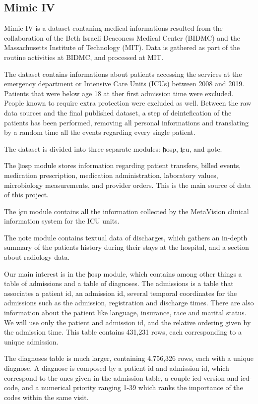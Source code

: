 \documentclass[]{marticle}
\begin{document}
\subsection{Mimic IV}

Mimic IV \cite{mimic-iv-cit} is a dataset contaning medical informations resulted from the collaboration
of the Beth Israeli Deaconess Medical Center (BIDMC) and the Massachusetts Institute of Technology
(MIT). Data is gathered as part of the routine activities at BIDMC, and processed at MIT.

The dataset contains informations about patients accessing the services at the emergency department
or Intensive Care Units (ICUs) between 2008 and 2019. Patients that were below age 18 at ther first
admission time were excluded. People known to require extra protection were excluded as well.
Between the raw data sources and the final published dataset, a step of deintefication of the
patients has been performed, removing all personal informations and translating by a random time all
the events regarding every single patient.

The dataset is divided into three separate modules: \c{hosp}, \c{icu}, and \c{note}.

The \c{hosp} module stores information regarding patient transfers, billed events, medication
prescription, medication administration, laboratory values, microbiology measurements, and provider
orders. This is the main source of data of this project.

The \c{icu} module contains all the information collected by the MetaVision clinical information
system for the ICU units.

The \c{note} module contains textual data of discharges, which gathers an in-depth summary of the
patients history during their stays at the hospital, and a section about radiology data.

Our main interest is in the \c{hosp} module, which contains among other things a table of admissions
and a table of diagnoses. The admissions is a table that associates a patient id, an admission id,
several temporal coordinates for the admissions such as the admission, registration and discharge
times. There are also information about the patient like language, insurance, race and marital
status. We will use only the patient and admission id, and the relative ordering given by the
admission time. This table contains 431,231 rows, each corresponding to a unique admission. 

The diagnoses table is much larger, containing 4,756,326 rows, each with a unique diagnose. A
diagnose is composed by a patient id and admission id, which correspond to the ones given in the
admission table, a couple icd-version and icd-code, and a numerical priority ranging 1-39 which
ranks the importance of the codes within the same visit.
\end{document}
